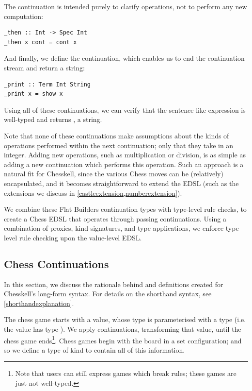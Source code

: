 The continuation  is intended purely to clarify operations, not to perform any new computation:

\begin{lstlisting}
_then :: Int -> Spec Int
_then x cont = cont x
\end{lstlisting}

And finally, we define the  continuation, which enables us to end the continuation stream and return a string:

\begin{lstlisting}
_print :: Term Int String
_print x = show x
\end{lstlisting}

Using all of these continuations, we can verify that the sentence-like expression  is well-typed and returns , a string.

Note that none of these continuations make assumptions about the kinds of operations performed within the next continuation; only that they take in an integer. Adding new operations, such as multiplication or division, is as simple as adding a new continuation which performs this operation. Such an approach is a natural fit for Chesskell, since the various Chess moves can be (relatively) encapsulated, and it becomes straightforward to extend the EDSL (such as the extensions we discuss in \cref{castleextension,numberextension}).

We combine these Flat Builders continuation types with type-level rule checks, to create a Chess EDSL that operates through passing continuations. Using a combination of proxies, kind signatures, and type applications, we enforce type-level rule checking upon the value-level EDSL.

\subsection{Chess Continuations}

In this section, we discuss the rationale behind and definitions created for Chesskell's long-form syntax. For details on the shorthand syntax, see \cref{shorthandexplanation}.

The chess game starts with a  value, whose  type is parameterised with a  type (i.e. the value has type ). We apply continuations, transforming that value, until the chess game ends\footnote{Note that users can still express games which break rules; these games are just not well-typed.}. Chess games begin with the board in a set configuration; and so we define a type  of kind  to contain all of this information.


